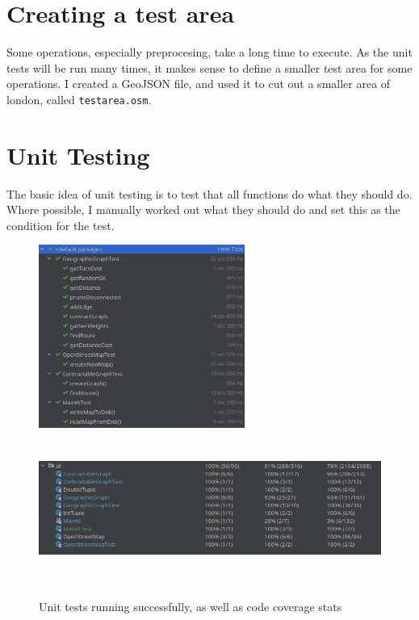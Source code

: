 \documentclass[11pt,twoside,a4paper]{report}
\begin{document}
\section{Creating a test area}
Some operations, especially preprocesing, take a long time to execute. As the unit tests will be run many times, it makes sense to define a smaller test area for some operations. I created a GeoJSON file, and used it to cut out a smaller area of london, called \texttt{testarea.osm}.
\section{Unit Testing}
The basic idea of unit testing is to test that all functions do what they should do. Where possible, I manually worked out what they should do and set this as the condition for the test.
\begin{figure}[t]
    \begin{center}
        \includegraphics[height=6cm]{test.png}
        \includegraphics[height=5cm]{coverage.png}
    \end{center}
    \caption{Unit tests running successfully, as well as code coverage stats}
    \label{testsuccess}
\end{figure}
\end{document}
